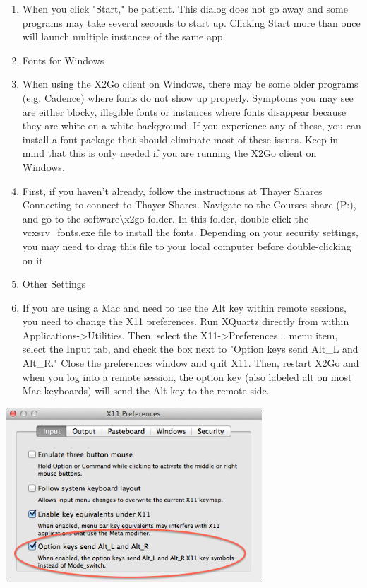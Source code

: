 \documentclass{article}
\begin{document}
\begin{enumerate}
\def\labelenumi{\arabic{enumi}.}
\setcounter{enumi}{18}
\item
  When you click "Start," be patient. This dialog does not go away and
  some programs may take several seconds to start up. Clicking Start
  more than once will launch multiple instances of the same app.
\item
  Fonts for Windows
\item
  When using the X2Go client on Windows, there may be some older
  programs (e.g. Cadence) where fonts do not show up properly. Symptoms
  you may see are either blocky, illegible fonts or instances where
  fonts disappear because they are white on a white background. If you
  experience any of these, you can install a font package that should
  eliminate most of these issues. Keep in mind that this is only needed
  if you are running the X2Go client on Windows.
\item
  First, if you haven't already, follow the instructions at Thayer
  Shares Connecting to connect to Thayer Shares. Navigate to the Courses
  share (P:), and go to the software\textbackslash x2go folder. In this
  folder, double-click the vcxsrv\_fonts.exe file to install the fonts.
  Depending on your security settings, you may need to drag this file to
  your local computer before double-clicking on it.
\item
  Other Settings
\item
  If you are using a Mac and need to use the Alt key within remote
  sessions, you need to change the X11 preferences. Run XQuartz directly
  from within Applications-\textgreater Utilities. Then, select the
  X11-\textgreater Preferences... menu item, select the Input tab, and
  check the box next to "Option keys send Alt\_L and Alt\_R." Close the
  preferences window and quit X11. Then, restart X2Go and when you log
  into a remote session, the option key (also labeled alt on most Mac
  keyboards) will send the Alt key to the remote side.
\end{enumerate}

\includegraphics[width=3.78346in,height=2.57874in]{images/media/image13.png}
\end{document}
